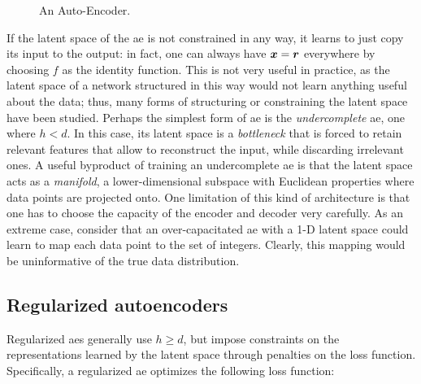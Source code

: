 \begin{figure*}[h!]
    \centering
    \resizebox{.45\textwidth}{!}{}
    \caption{An Auto-Encoder.}
    \label{fig:autoencoder}
\end{figure*}
If the latent space of the \gls{ae} is not constrained in any way, it learns to just copy its input to the output: in fact, one can always have $\Vector{x} = \Vector{r}$ everywhere by choosing $f$ as the identity function. This is not very useful in practice, as the latent space of a network structured in this way would not learn anything useful about the data; thus, many forms of structuring or constraining the latent space have been studied. Perhaps the simplest form of \gls{ae} is the \emph{undercomplete} \gls{ae}, \ie one where $h < d$. In this case, its latent space is a \emph{bottleneck} that is forced to retain relevant features that allow to reconstruct the input, while discarding irrelevant ones. A useful byproduct of training an undercomplete \gls{ae} is that the latent space acts as a \emph{manifold}, \ie a lower-dimensional subspace with Euclidean properties where data points are projected onto. One limitation of this kind of architecture is that one has to choose the capacity of the encoder and decoder very carefully. As an extreme case, consider that an over-capacitated \gls{ae} with a 1-D latent space could learn to map each data point to the set of integers. Clearly, this mapping would be uninformative of the true data distribution.

\subsection{Regularized autoencoders}
Regularized \glspl{ae} generally use $h \geq d$, but impose constraints on the representations learned by the latent space through penalties on the loss function. Specifically, a regularized \gls{ae} optimizes the following loss function:

